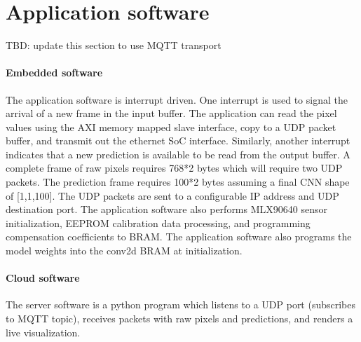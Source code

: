 \section{Application software}
TBD: update this section to use MQTT transport
\paragraph{Embedded software}
The application software is interrupt driven. One interrupt is used to signal
the arrival of a new frame in the input buffer. The application can read the
pixel values using the AXI memory mapped slave interface, copy to a UDP packet
buffer, and transmit out the ethernet SoC interface. Similarly, another
interrupt indicates that a new prediction is available to be read from the
output buffer. A complete frame of raw pixels requires 768*2 bytes which will
require two UDP packets. The prediction frame requires 100*2 bytes assuming a
final CNN shape of [1,1,100]. The UDP packets are sent to a configurable IP
address and UDP destination port.  The application software also performs
MLX90640 sensor initialization, EEPROM calibration data processing, and
programming compensation coefficients to BRAM.
The application software also programs the model weights into the conv2d BRAM
at initialization.
\paragraph{Cloud software}
The server software is a python program which listens to a UDP port (subscribes to MQTT topic), receives
packets with raw pixels and  predictions, and renders a live visualization.


